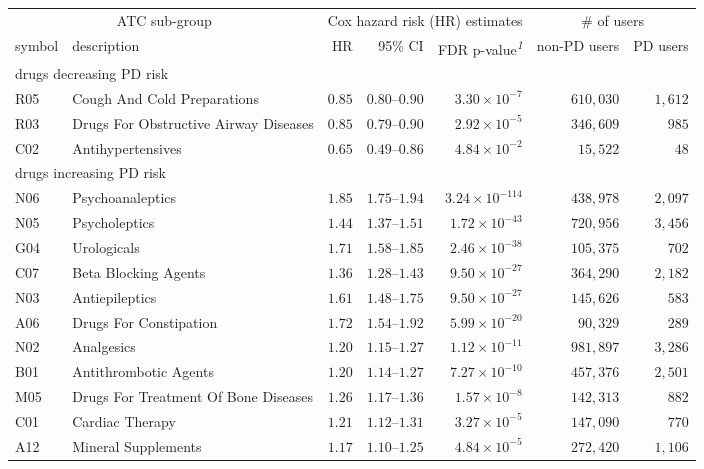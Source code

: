 \setlength{\LTpost}{0mm}
\begin{longtable}{llrrrrr}
\toprule
\multicolumn{2}{c}{ATC sub-group} & \multicolumn{3}{c}{Cox hazard risk (HR) estimates} & \multicolumn{2}{c}{\# of users} \\ 
\cmidrule(lr){1-2} \cmidrule(lr){3-5} \cmidrule(lr){6-7}
symbol & description & HR & 95\% CI & FDR p-value\textsuperscript{\textit{1}} & non-PD users & PD users \\ 
\midrule
\multicolumn{7}{l}{drugs decreasing PD risk} \\ 
\midrule
R05 & Cough And Cold Preparations & $0.85$ & $0.80$–$0.90$ & $3.30 \times 10^{-7}$ & $610,030$ & $1,612$ \\ 
R03 & Drugs For Obstructive Airway Diseases & $0.85$ & $0.79$–$0.90$ & $2.92 \times 10^{-5}$ & $346,609$ & $985$ \\ 
C02 & Antihypertensives & $0.65$ & $0.49$–$0.86$ & $4.84 \times 10^{-2}$ & $15,522$ & $48$ \\ 
\midrule
\multicolumn{7}{l}{drugs increasing PD risk} \\ 
\midrule
N06 & Psychoanaleptics & $1.85$ & $1.75$–$1.94$ & $3.24 \times 10^{-114}$ & $438,978$ & $2,097$ \\ 
N05 & Psycholeptics & $1.44$ & $1.37$–$1.51$ & $1.72 \times 10^{-43}$ & $720,956$ & $3,456$ \\ 
G04 & Urologicals & $1.71$ & $1.58$–$1.85$ & $2.46 \times 10^{-38}$ & $105,375$ & $702$ \\ 
C07 & Beta Blocking Agents & $1.36$ & $1.28$–$1.43$ & $9.50 \times 10^{-27}$ & $364,290$ & $2,182$ \\ 
N03 & Antiepileptics & $1.61$ & $1.48$–$1.75$ & $9.50 \times 10^{-27}$ & $145,626$ & $583$ \\ 
A06 & Drugs For Constipation & $1.72$ & $1.54$–$1.92$ & $5.99 \times 10^{-20}$ & $90,329$ & $289$ \\ 
N02 & Analgesics & $1.20$ & $1.15$–$1.27$ & $1.12 \times 10^{-11}$ & $981,897$ & $3,286$ \\ 
B01 & Antithrombotic Agents & $1.20$ & $1.14$–$1.27$ & $7.27 \times 10^{-10}$ & $457,376$ & $2,501$ \\ 
M05 & Drugs For Treatment Of Bone Diseases & $1.26$ & $1.17$–$1.36$ & $1.57 \times 10^{-8}$ & $142,313$ & $882$ \\ 
C01 & Cardiac Therapy & $1.21$ & $1.12$–$1.31$ & $3.27 \times 10^{-5}$ & $147,090$ & $770$ \\ 
A12 & Mineral Supplements & $1.17$ & $1.10$–$1.25$ & $4.84 \times 10^{-5}$ & $272,420$ & $1,106$ \\ 

\end{longtable}
